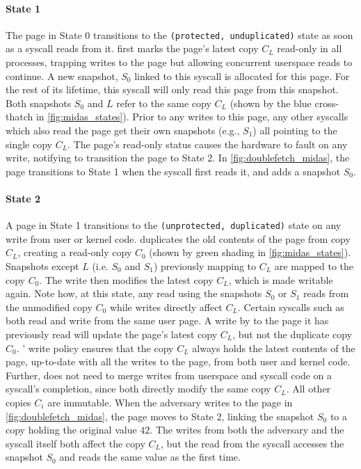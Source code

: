 \documentclass[letterpaper,twocolumn,10pt]{article}
\begin{document}
\paragraph{State 1}
The page in State 0 transitions to the \texttt{(protected, unduplicated)} state as soon as a syscall 
reads from it.
\midas first marks the page's latest copy $C_L$ read-only in all processes, 
trapping writes to the page but allowing concurrent userspace reads to continue.
A new snapshot, $S_0$ linked to this syscall is allocated for this page.
For the rest of its lifetime, this syscall will only read this page from this snapshot.
Both snapshots $S_0$ and $L$ refer to the same copy $C_L$ (shown by the 
blue cross-thatch in \autoref{fig:midas_states}).
Prior to any writes to this page, any other syscalls which also read the page  
get their own snapshots (e.g., $S_1$) all pointing to the single copy $C_L$.
The page's read-only status causes the hardware to fault on any write,
notifying \midas to transition the page to State 2.
In \autoref{fig:doublefetch_midas}, the page transitions to State 1 when 
the syscall first reads it, and adds a snapshot $S_0$.

\paragraph{State 2}
A page in State 1 transitions to the \texttt{(unprotected, duplicated)} state 
on any write from user or kernel code.
\midas duplicates the old contents of the page from copy $C_L$, creating a 
read-only copy $C_0$ (shown by green shading in \autoref{fig:midas_states}).
Snapshots except $L$ (i.e. $S_0$ and $S_1$) previously mapping to $C_L$ are 
mapped to the copy $C_0$.
The write then modifies the latest copy $C_L$, which is made writable again.
Note how, at this state, any read using the snapshots $S_0$ or $S_1$ reads 
from the unmodified copy $C_0$ while writes directly affect $C_L$.
Certain syscalls such as  both read and write from 
the same user page. 
A write by  to the page it has previously read will update
the page's latest copy $C_L$, but not the duplicate copy $C_0$.
\midas' write policy ensures that the copy $C_L$ always holds the latest 
contents of the page, up-to-date with all the writes to the page, from both user 
and kernel code. 
Further, \midas does not need to merge writes from userspace and syscall code
on a syscall's completion, since both directly modify the same copy $C_L$.
All other copies $C_i$ are immutable.
When the adversary writes to the page in \autoref{fig:doublefetch_midas}, the
page moves to State 2, linking the snapshot $S_0$ to a copy holding the 
original value $42$.
The writes from both the adversary and the syscall itself both affect 
the copy $C_L$, but the read from the syscall accesses the snapshot $S_0$
and reads the same value as the first time.
\end{document}
